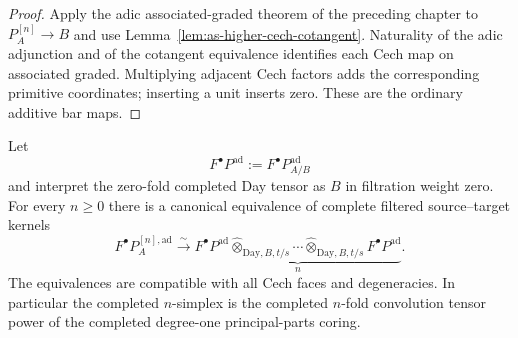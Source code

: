\begin{proof}
Apply the adic associated-graded theorem of the preceding chapter to
$P_A^{[n]}\to B$ and use
Lemma~\ref{lem:as-higher-cech-cotangent}.  Naturality of the adic adjunction
and of the cotangent equivalence identifies each Cech map on associated
graded.  Multiplying adjacent Cech factors adds the corresponding primitive
coordinates; inserting a unit inserts zero.  These are the ordinary additive
bar maps.
\end{proof}


\begin{proposition}
\label{prop:as-iterated-completed-cech-coring}
Let
\[
    F^\bullet P^{\mathrm{ad}}
    :=
    F^\bullet P_{A/B}^{\mathrm{ad}}
\]
and interpret the zero-fold completed Day tensor as $B$ in filtration weight
zero.  For every $n\geq0$ there is a canonical equivalence of complete
filtered source--target kernels
\[
\boxed{
    F^\bullet P_A^{[n],\mathrm{ad}}
    \xrightarrow{\sim}
    \underbrace{
        F^\bullet P^{\mathrm{ad}}
        \widehat\otimes_{\mathrm{Day},B,t/s}
        \cdots
        \widehat\otimes_{\mathrm{Day},B,t/s}
        F^\bullet P^{\mathrm{ad}}
    }_{n}.
}
\]
The equivalences are compatible with all Cech faces and degeneracies.  In
particular the completed $n$-simplex is the completed $n$-fold convolution
tensor power of the completed degree-one principal-parts coring.
\end{proposition}

